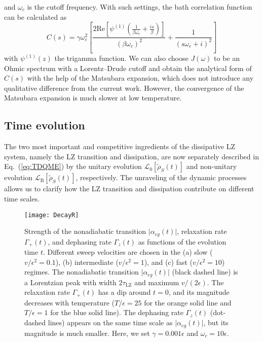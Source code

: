 \documentclass[english,nofootinbib, pra, twocolumn,superscriptaddress]{revtex4-1}
\begin{document}
and $\omega_{c}$ is the cutoff frequency. With such settings,
the bath correlation function can be calculated as 
\begin{equation}
C(s)=\gamma\omega_{c}^{2}\left[\frac{2\text{Re}[\psi^{(1)}(\frac{1}{\beta\omega_{c}}+\frac{is}{\beta})]}{(\beta\omega_{c})^{2}}+\frac{1}{(s\omega_{c}+i)^{2}}\right]\label{eq:cs2}
\end{equation}
with $\psi^{(1)}(z)$ the trigamma function. We can also choose $J(\omega)$
to be an Ohmic spectrum with a Lorentz--Drude cutoff and obtain the analytical
form of $C(s)$ with the help of the Matsubara expansion, which does not
introduce any qualitative difference from the current work. However, the convergence
of the Matsubara expansion is much slower at low temperature.


\subsection{Time evolution}

The two most important and competitive ingredients of the dissipative
LZ system, namely the LZ transition and dissipation, are now separately described
in Eq.~(\ref{eq:TDQME}) by the unitary evolution $\mathcal{L}_{\text{0}}[\tilde{\rho}_{S}(t)]$
and non-unitary evolution $\mathcal{L}_{\text{B}}[\tilde{\rho}_{S}(t)]$,
respectively. The unraveling of the dynamic processes allows us to
clarify how the LZ transition and dissipation contribute on different
time scales. 

\begin{figure}
\texttt{[image: DecayR]}\caption{Strength of the nonadiabatic transition $\vert\alpha_{eg}(t)\vert$,
relaxation rate $\Gamma_{+}(t)$, and dephasing rate $\Gamma_{z}(t)$
as functions of the evolution time $t$. Different sweep velocities are
chosen in the (a) slow ($v/\epsilon^{2}=0.1$), (b) intermediate ($v/\epsilon^{2}=1$),
and (c) fast ($v/\epsilon^{2}=10$) regimes. The nonadiabatic transition
$\vert\alpha_{eg}(t)\vert$ (black dashed line) is a Lorentzian peak
with width $2\tau_{\text{LZ}}$ and maximum $v/(2\epsilon)$. The
relaxation rate $\Gamma_{+}(t)$ has a dip around $t=0$, and its magnitude decreases with temperature
($T/\epsilon=25$ for the orange solid line and $T/\epsilon=1$ for the blue
solid line). The dephasing rate $\Gamma_{z}(t)$ (dot-dashed lines) appears
on the same time scale as $\vert\alpha_{eg}(t)\vert$, but its magnitude
is much smaller. Here, we set $\gamma=0.001\epsilon$ and $\omega_{c}=10\epsilon$. }
\label{fig:decay}
\end{figure}
\end{document}
